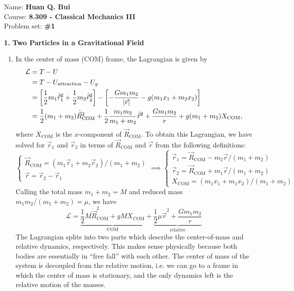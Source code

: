 \documentclass{article}
\theoremstyle{definition}
\newcommand{\lag}{\mathcal{L}}
\newcommand{\f}[2]{\frac{#1}{#2}}
\newcommand{\lb}{\left[}
\newcommand{\rb}{\right]}
\begin{document}
\begin{framed}
	\noindent Name: \textbf{Huan Q. Bui}\\
	Course: \textbf{8.309 - Classical Mechanics III}\\
	Problem set: \textbf{\#1}
\end{framed}
	
	
	
\noindent \textbf{1.} \textbf{Two Particles in a Gravitational Field}


\begin{enumerate}[label=(\alph*)]
	\item In the center of mass (COM) frame, the Lagrangian is given by 
	\begin{align*}
	\lag 
	&= T - U\\
	&= T - U_\text{attraction} - U_g\\
	&= \lb \f{1}{2} m_1 \dot{\vec{r}}_1^2  + \f{1}{2}m_2\dot{\vec{r}}_2^2\rb - \lb - \f{Gm_1m_2}{\abs{\vec{r}}} - g(m_1x_1 + m_2x_2) \rb \\ 
	&= \f{1}{2}(m_1+m_2) \dot{\vec{R}}_{\text{COM}}^2 + \f{1}{2} \f{m_1m_2}{m_1+m_2} \dot{\vec{r}}^2 + \f{Gm_1m_2}{r} + g(m_1+m_2) X_\text{COM},
	\end{align*}
	where $X_\text{COM}$ is the $x$-component of $\vec{R}_\text{COM}$. To obtain this Lagrangian, we have solved for $\vec{r}_1$ and $\vec{r}_2$ in terms of $\vec{R}_\text{COM}$ and $\vec{r}$ from the following definitions:
	\begin{equation*}
	\begin{cases}
	\vec{R}_\text{COM} = (m_1 \vec{r}_1 + m_2 \vec{r}_2)/(m_1+m_2)  \\
	\vec{r} = \vec{r}_2 - \vec{r}_1
	\end{cases} 
	\implies \begin{cases}
	\vec{r}_1 = \vec{R}_\text{COM} - m_2 \vec{r}/(m_1+m_2) \\
	\vec{r}_2 = \vec{R}_\text{COM} + m_1 \vec{r}/(m_1+m_2) \\
	X_\text{COM} = (m_1 x_1 + m_1 x_2)/(m_1 + m_2)
	\end{cases}
	\end{equation*}
	Calling the total mass $m_1 + m_2 = M$ and reduced mass $m_1m_2/(m_1+m_2) = \mu$, we have
	\begin{equation*}
	\boxed{\lag = 
	\underbrace{ \f{1}{2}M \dot{\vec{R}}_{\text{COM}}^2 + gMX_\text{COM} }_{\text{COM}}  + \underbrace{ \f{1}{2} \mu \dot{\vec{r}}^2 + \f{Gm_1m_2}{r}  }_{\text{relative}}}
	\end{equation*}
	The Lagrangian splits into two parts which describe the center-of-mass and relative dynamics, respectively. This makes sense physically because both bodies are essentially in ``free fall'' with each other. The center of mass of the system is decoupled from the relative motion, i.e. we can go to a frame in which the center of mass is stationary, and the only dynamics left is the relative motion of the masses.  
	

\end{enumerate}
\end{document}
